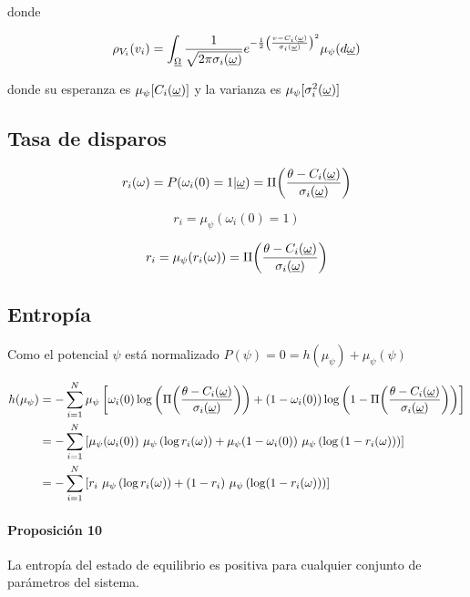 donde

\begin{equation*}
  \rho_{V_i}(v_i) = \int_{\underline{\Omega}} \frac{1}{\sqrt{2 \pi \sigma_i(\underline{\omega})}} e^{-\frac{1}{2}\left(\frac{v-C_i(\underline{\omega})}{\sigma_i(\underline{\omega})}\right)^2} \mu_\psi(d\underline{\omega})
\end{equation*}

donde su esperanza es $\mu_\psi[C_i(\underline{\omega})]$ y la varianza es $\mu_\psi[\sigma_i^2(\underline{\omega})]$


\subsection{Tasa de disparos}

\begin{equation*}
  r_i(\omega) = P(\omega_i(0)=1 | \underline{\omega}) = \Pi\!\left(\frac{\theta-C_i(\underline{\omega})}{\sigma_i(\underline{\omega})}\right)
\end{equation*}


\begin{equation*}
  r_i = \mu_\psi(\omega_i(0)=1)
\end{equation*}

\begin{equation*}
  r_i = \mu_\psi (r_i(\omega))=\Pi\!\left(\frac{\theta-C_i(\underline{\omega})}{\sigma_i(\underline{\omega})}\right)
\end{equation*}



\subsection{Entropía}

Como el potencial $\psi$ está normalizado $P(\psi)=0=h(\mu_\psi)+\mu_\psi(\psi)$

\begin{align}
   h(\mu_\psi) & = - \sum_{i=1}^N \mu_\psi \left[ \omega_i(0) \log\left(\Pi\!\left(\frac{\theta-C_i(\underline{\omega})}{\sigma_i(\underline{\omega})}\right)\right) + (1-\omega_i(0)) \log\left( 1-\Pi\!\left(\frac{\theta-C_i(\underline{\omega})}{\sigma_i(\underline{\omega})}\right)\right) \right]  \nonumber \\
  & = - \sum_{i=1}^N \left[\mu_\psi(\omega_i(0)) \ \mu_\psi\left( \log r_i(\omega) \right)+ \mu_\psi(1-\omega_i(0)) \ \mu_\psi \left(\log\left( 1-r_i(\omega) \right) \right) \right] \nonumber\\
  & = - \sum_{i=1}^N \left[ r_i \ \mu_\psi\left( \log r_i(\omega) \right)+ (1-r_i) \ \mu_\psi \left(\log ( 1-r_i(\omega) ) \right) \right] \label{eqn:entro1}
\end{align}
  
\paragraph{Proposición 10} La entropía del estado de equilibrio es positiva para cualquier conjunto de parámetros del sistema.

